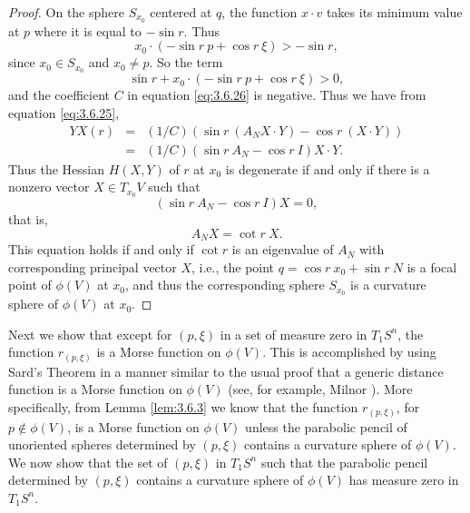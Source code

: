 \documentclass[12pt]{article}
\begin{document}
\begin{proof}
On the sphere
$S_{x_0}$ centered at $q$, the function $x \cdot v$ takes its minimum value at $p$ where it is equal to $- \sin r$.  Thus
\begin{equation}
\label{eq:3.6.28}
x_0 \cdot ( -\sin r\  p + \cos r\  \xi) > - \sin r,
\end{equation}
since $x_0 \in S_{x_0}$ and $x_0 \neq p$.  So the term
\begin{equation}
\label{eq:3.6.29}
\sin r + x_0 \cdot ( -\sin r\  p + \cos r\  \xi) > 0,
\end{equation}
and the coefficient $C$ in equation \eqref{eq:3.6.26} is negative.  Thus we have from equation \eqref{eq:3.6.25},
\begin{eqnarray}
\label{eq:3.6.30}
YX(r) &=& (1/C) (\sin r \ (A_N X \cdot Y) - \cos r \ (X \cdot Y))\\
 &=& (1/C) (\sin r \ A_N - \cos r \ I) X \cdot Y.\nonumber
\end{eqnarray}
Thus the Hessian $H(X,Y)$ of $r$ at $x_0$ is degenerate if and only if there is a nonzero vector $X \in T_{x_0} V$
such that 
\begin{equation}
\label{eq:3.6.31}
(\sin r \ A_N - \cos r \ I) X = 0,
\end{equation}
that is,
\begin{equation}
\label{eq:3.6.32}
A_N X = \cot r \ X.
\end{equation}
This equation holds if and only if
$\cot r$ is an eigenvalue of $A_N$ with corresponding principal vector $X$, i.e., the point
$q = \cos r\  x_0 + \sin r\  N$ is a focal point of $\phi (V)$ at $x_0$, and thus the corresponding sphere $S_{x_0}$ is
a curvature sphere of $\phi (V)$ at $x_0$. 
\end{proof}

Next we show that except for $(p,\xi)$ in a set of measure zero in $T_1S^n$, the function $r_{(p,\xi)}$ is a Morse function
on $\phi (V)$.  This is accomplished by using Sard's Theorem 
in a manner similar to the usual proof that
a generic distance 
function is a Morse function on $\phi (V)$ (see, for example, Milnor \cite[pp. 32--38]{Mil}).
More specifically, from Lemma \ref{lem:3.6.3} we know that the function $r_{(p,\xi)}$,
for $p \notin \phi(V)$, is a Morse function
on $\phi (V)$ unless the parabolic pencil of unoriented spheres 
determined by $(p,\xi)$ contains a curvature
sphere of $\phi (V)$.  We now show that the set of $(p,\xi)$ in $T_1S^n$ such that the parabolic pencil determined
by $(p,\xi)$ contains a curvature sphere of $\phi (V)$ has measure zero in $T_1S^n$.
\end{document}

